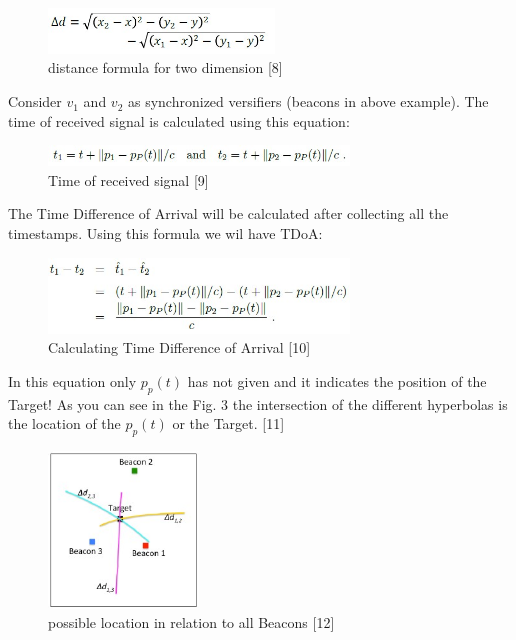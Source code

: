 \begin{figure}[htp]
    \centering
    \includegraphics[width=6cm]{5.jpg}
    \caption{distance formula for two dimension [8]}
    \label{fig:formula}
\end{figure}




Consider $v_1$ and $v_2$ as synchronized versifiers (beacons in above example). The time of received signal is calculated using this equation:

\begin{figure}[htp]
    \centering
    \includegraphics[width=8cm]{6.jpg}
    \caption{Time of received signal [9]}
    \label{fig:formula}
\end{figure}


The Time Difference of Arrival will be calculated after collecting all the timestamps. Using this formula we wil have TDoA:


\begin{figure}[htp]
    \centering
    \includegraphics[width=8cm]{7.jpg}
    \caption{Calculating Time Difference of Arrival [10]}
    \label{fig:formula}
\end{figure}

In this equation only $p_p(t)$ has not given and it indicates the position of the Target! As you can see in the Fig. 3 the intersection of the different hyperbolas is the location of the $p_p(t)$ or the Target. [11]

\begin{figure}[htp]
    \centering
    \includegraphics[width=4cm]{8.jpg}
    \caption{possible location in relation to all Beacons [12]}
    \label{fig:fig}
\end{figure}

